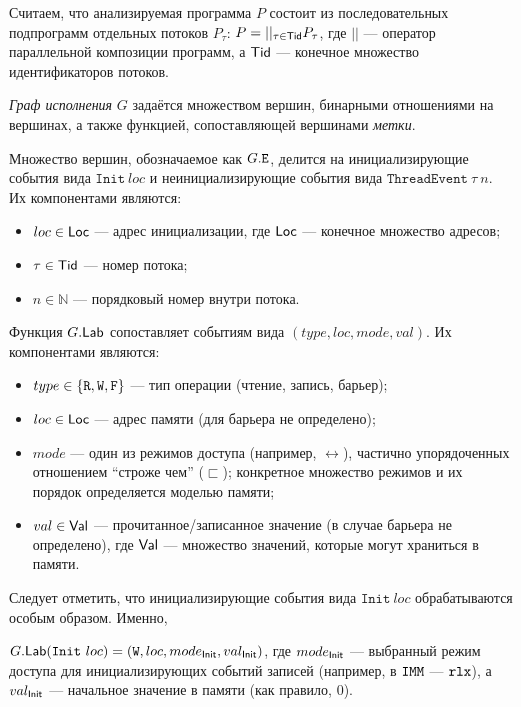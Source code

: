 Считаем, что анализируемая программа $P$ состоит из последовательных подпрограмм отдельных потоков $P_\tau$: $P = ||_{\tau\in \mathsf{Tid}} P_\tau$, где $||$ --- оператор параллельной композиции программ, а $\mathsf{Tid}$ --- конечное множество идентификаторов потоков.

\begin{defn}
  \label{def:graph}
  \emph{Граф исполнения} $G$ задаётся множеством вершин, бинарными отношениями на вершинах, а также функцией, сопоставляющей вершинами \emph{метки}. 
\end{defn}
  
  Множество вершин, обозначаемое как $G.{\mathtt{E}}$, делится на инициализирующие события вида $\mathtt{Init}\ loc$ и неинициализирующие события вида $\mathtt{ThreadEvent}\ \tau\ n$. Их компонентами являются:
  \begin{itemize}
  \item $loc \in \mathsf{Loc}$ --- адрес инициализации, где $\mathsf{Loc}$ --- конечное множество адресов;
  \item $\tau \in \mathsf{Tid}$ --- номер потока;
  \item $n\in \mathbb{N}$ --- порядковый номер внутри потока.
  \end{itemize}
    
Функция $G.\mathsf{Lab}$ сопоставляет событиям  вида $(type, loc, mode, val)$. Их компонентами являются:
\begin{itemize}
\item $type \in \{{\mathtt{R}}, {\mathtt{W}}, {\mathtt{F}}\}$ --- тип операции (чтение, запись, барьер);
\item $loc \in \mathsf{Loc}$ --- адрес памяти (для барьера не определено);
\item $mode$ --- один из режимов доступа (например, $\rel$), частично упорядоченных отношением ``строже чем'' ($\sqsubset$); конкретное множество режимов и их порядок определяется моделью памяти;
\item $val\in \mathsf{Val}$ --- прочитанное/записанное значение (в случае барьера не определено), где $\mathsf{Val}$ --- множество значений, которые могут храниться в памяти.
\end{itemize}

Следует отметить, что инициализирующие события вида $\mathtt{Init}\ loc$ обрабатываются особым образом. Именно,

$G.\mathsf{Lab}(\mathtt{Init}\ loc) = ({\mathtt{W}}, loc, mode_{\mathsf{Init}}, val_{\mathsf{Init}})$, где $mode_{\mathsf{Init}}$ --- выбранный режим доступа для инициализирующих событий записей (например, в $\mathtt{IMM}$ --- $\mathtt{rlx}$), а $val_{\mathsf{Init}}$ --- начальное значение в памяти (как правило, 0).

